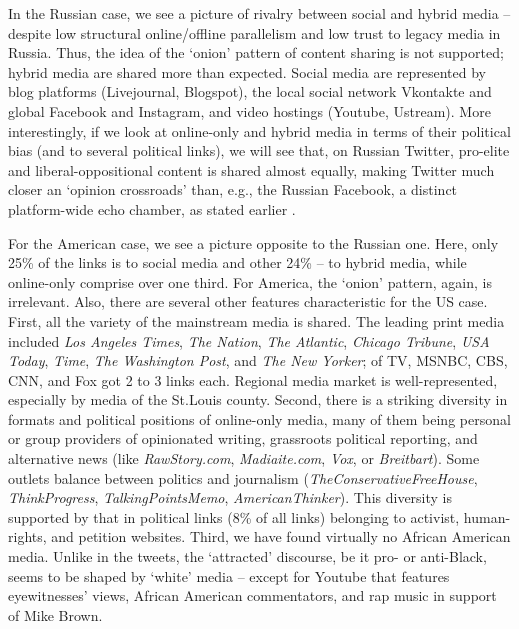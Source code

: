 In the Russian case, we see a picture of rivalry between social and hybrid media -- despite low structural online/offline parallelism and low trust to legacy media in Russia. Thus, the idea of the ‘onion’ pattern of content sharing is not supported; hybrid media are shared more than expected. Social media are represented by blog platforms (Livejournal, Blogspot), the local social network Vkontakte and global Facebook and Instagram, and video hostings (Youtube, Ustream). More interestingly, if we look at online-only and hybrid media in terms of their political bias (and to several political links), we will see that, on Russian Twitter, pro-elite and liberal-oppositional content is shared almost equally, making Twitter much closer an ‘opinion crossroads’ than, e.g., the Russian Facebook, a distinct platform-wide echo chamber, as stated earlier \cite{BodrunovaLitvinenkoGavraYakunin}.

For the American case, we see a picture opposite to the Russian one. Here, only 25\% of the links is to social media and other 24\% -- to hybrid media, while online-only comprise over one third. For America, the ‘onion’ pattern, again, is irrelevant. Also, there are several other features characteristic for the US case. First, all the variety of the mainstream media is shared. The leading print media included \textit{Los Angeles Times}, \textit{The Nation}, \textit{The Atlantic}, \textit{Chicago Tribune}, \textit{USA Today}, \textit{Time}, \textit{The Washington Post}, and \textit{The New Yorker}; of TV, MSNBC, CBS, CNN, and Fox got 2 to 3 links each. Regional media market is well-represented, especially by media of the St.Louis county. Second, there is a striking diversity in formats and political positions of online-only media, many of them being personal or group providers of opinionated writing, grassroots political reporting, and alternative news (like \textit{RawStory.com}, \textit{Madiaite.com}, \textit{Vox}, or \textit{Breitbart}). Some outlets balance between politics and journalism (\textit{TheConservativeFreeHouse}, \textit{ThinkProgress}, \textit{TalkingPointsMemo}, \textit{AmericanThinker}). This diversity is supported by that in political links (8\% of all links) belonging to activist, human-rights, and petition websites. Third, we have found virtually no African American media. Unlike in the tweets, the ‘attracted’ discourse, be it pro- or anti-Black, seems to be shaped by ‘white’ media -- except for Youtube that features eyewitnesses’ views, African American commentators, and rap music in support of Mike Brown.

